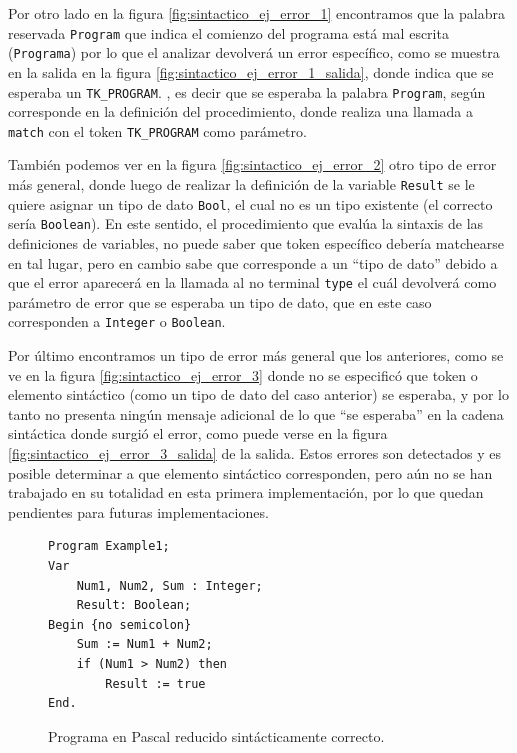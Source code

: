 Por otro lado en la figura \ref{fig:sintactico_ej_error_1} encontramos que la palabra reservada \texttt{Program} que indica el comienzo del programa está mal escrita (\texttt{Programa}) por lo que el analizar devolverá un error específico, como se muestra en la salida en la figura \ref{fig:sintactico_ej_error_1_salida}, donde indica que se esperaba un \texttt{TK\_PROGRAM}. , es decir que se esperaba la palabra \texttt{Program}, según corresponde en la definición del procedimiento, donde realiza una llamada a \texttt{match} con el token \texttt{TK\_PROGRAM} como parámetro.

También podemos ver en la figura \ref{fig:sintactico_ej_error_2} otro tipo de error más general, donde luego de realizar la definición de la variable \texttt{Result} se le quiere asignar un tipo de dato \texttt{Bool}, el cual no es un tipo existente (el correcto sería \texttt{Boolean}). En este sentido, el procedimiento que evalúa la sintaxis de las definiciones de variables, no puede saber que token específico debería matchearse en tal lugar, pero en cambio sabe que corresponde a un ``tipo de dato'' debido a que el error aparecerá en la llamada al no terminal \texttt{type} el cuál devolverá como parámetro de error que se esperaba un tipo de dato, que en este caso corresponden a \texttt{Integer} o \texttt{Boolean}.

Por último encontramos un tipo de error más general que los anteriores, como se ve en la figura \ref{fig:sintactico_ej_error_3} donde no se especificó que token o elemento sintáctico (como un tipo de dato del caso anterior) se esperaba, y por lo tanto no presenta ningún mensaje adicional de lo que ``se esperaba'' en la cadena sintáctica donde surgió el error, como puede verse en la figura \ref{fig:sintactico_ej_error_3_salida} de la salida. Estos errores son detectados y es posible determinar a que elemento sintáctico corresponden, pero aún no se han trabajado en su totalidad en esta primera implementación, por lo que quedan pendientes para futuras implementaciones.

\begin{figure}[H]
\begin{verbatim}
Program Example1;
Var       
    Num1, Num2, Sum : Integer;
    Result: Boolean;
Begin {no semicolon}
    Sum := Num1 + Num2;
    if (Num1 > Num2) then
        Result := true
End.
\end{verbatim}
\caption{Programa en Pascal reducido sintácticamente correcto.}
\label{fig:sintactico_ej_correcto}
\end{figure}

